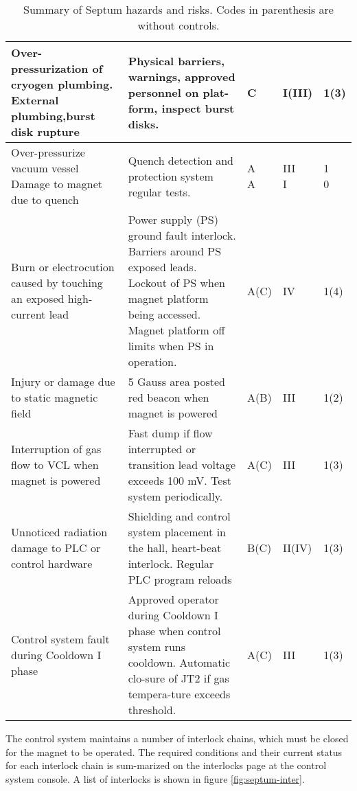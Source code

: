 {\begin{table}[htp]
\begin{tabular}{|p{120pt}|p{170pt}|l|l|l|}
Over-pressurization of cryogen plumbing. External plumbing,burst disk rupture 
& Physical barriers, warnings, approved personnel on plat-form, inspect burst disks.
& C      &I(III)  & 1(3) \\ \hline

Over-pressurize vacuum vessel Damage to magnet due to quench
& Quench detection and protection system regular tests.
& \parbox{20pt}{A \\ A} & \parbox{20pt}{III \\ I} & \parbox{20pt}{1 \\ 0} \\ \hline

Burn or electrocution caused by touching an exposed high-current lead 
& Power supply (PS) ground fault interlock.  Barriers around PS exposed leads. 
  Lockout of PS when magnet platform being accessed. Magnet platform off limits 
  when PS in operation.	                          
& A(C)& IV  & 1(4) \\ \hline

Injury or damage due to static magnetic field     
& 5 Gauss area posted red beacon when magnet is powered     
& A(B) & III	  & 1(2)\\ \hline

Interruption of gas flow to VCL when magnet is powered
& Fast dump if flow interrupted or transition lead voltage exceeds 100 mV. Test system periodically.      
& A(C) & III	  & 1(3)\\ \hline

Unnoticed radiation damage to PLC or control hardware
& Shielding and control system placement in the hall, heart-beat interlock. Regular PLC program reloads
& B(C) & II(IV)& 1(3)\\ \hline

Control system fault during Cooldown I phase   
& Approved operator during Cooldown I phase when control system runs cooldown. 
  Automatic clo-sure of JT2 if gas tempera-ture exceeds threshold.  
& A(C) & III   & 1(3)\\ \hline
\end{tabular}
\caption[Septum: risk]{Summary of Septum hazards and risks.  Codes in parenthesis are without controls.}
\label{tab:septumrisk}
\end{table}


The control system maintains a number of interlock chains, which must be closed for the magnet to be 
operated.  The required conditions and their current status for each interlock chain is sum-marized on 
the interlocks page at the control system console.  A list of interlocks is shown in figure \ref{fig:septum-inter}.

}
